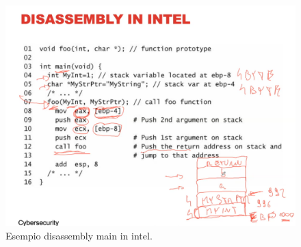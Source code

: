 \begin{figure}[H]
	\centering
    \includegraphics[width=14cm, keepaspectratio]{santini/img/cap_2/disass_intel_1.png}
	\caption{Esempio disassembly main in intel.}\label{fig:disass_intel_1}
\end{figure}

